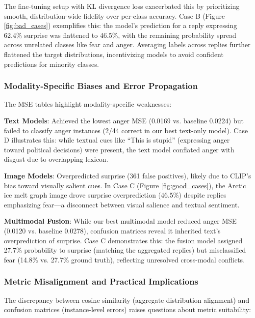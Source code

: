 The fine-tuning setup with KL divergence loss exacerbated this by prioritizing smooth, distribution-wide fidelity over per-class accuracy. Case B (Figure \ref{fig:bad_cases}) exemplifies this: the model’s prediction for a reply expressing 62.4\% surprise was flattened to 46.5\%, with the remaining probability spread across unrelated classes like fear and anger. Averaging labels across replies further flattened the target distributions, incentivizing models to avoid confident predictions for minority classes.

\subsubsection*{Modality-Specific Biases and Error Propagation}
The MSE tables highlight modality-specific weaknesses:
\newline

\textbf{Text Models}: Achieved the lowest anger MSE (0.0169 vs. baseline 0.0224) but failed to classify anger instances (2/44 correct in our best text-only model). Case D illustrates this: while textual cues like “This is stupid” (expressing anger toward political decisions) were present, the text model conflated anger with disgust due to overlapping lexicon.
\newline

\textbf{Image Models}: Overpredicted surprise (361 false positives), likely due to CLIP’s bias toward visually salient cues. In Case C (Figure \ref{fig:good_cases}), the Arctic ice melt graph image drove surprise overprediction (46.5\%) despite replies emphasizing fear—a disconnect between visual salience and textual sentiment. 
\newline

\textbf{Multimodal Fusion}: While our best multimodal model reduced anger MSE (0.0120 vs. baseline 0.0278), confusion matrices reveal it inherited text’s overprediction of surprise. Case C demonstrates this: the fusion model assigned 27.7\% probability to surprise (matching the aggregated replies) but misclassified fear (14.8\% vs. 27.7\% ground truth), reflecting unresolved cross-modal conflicts.

\subsubsection*{Metric Misalignment and Practical Implications}
The discrepancy between cosine similarity (aggregate distribution alignment) and confusion matrices (instance-level errors) raises questions about metric suitability:
\newline

